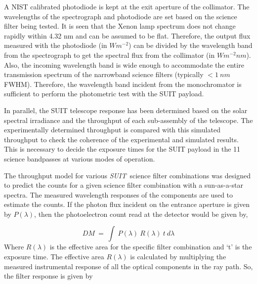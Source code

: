 \documentclass[12pt]{spieman}  %
\newcommand{\suit}{{\it{SUIT}}}
\begin{document}
	A NIST calibrated photodiode is kept at the exit aperture of the collimator. The wavelengths of the spectrograph and photodiode are set based on the science filter being tested. It is seen that the Xenon lamp spectrum does not change rapidly within 4.32 nm and can be assumed to be flat. Therefore, the output flux measured with the photodiode (in $Wm^{-2}$) can be divided by the wavelength band from the spectrograph to get the spectral flux from the collimator (in $W m^{-2} nm$). Also, the incoming wavelength band is wide enough to accommodate the entire transmission spectrum of the narrowband science filters (typically $< 1~nm$ FWHM). Therefore, the wavelength band incident from the monochromator is sufficient to perform the photometric test with the SUIT payload.
		
	In parallel, the SUIT telescope response has been determined based on the solar spectral irradiance and the throughput of each sub-assembly of the telescope. The experimentally determined throughput is compared with this simulated throughput to check the coherence of the experimental and simulated results. This is necessary to decide the exposure times for the SUIT payload in the 11 science bandpasses at various modes of operation.

 The throughput model for various \suit~science filter combinations was designed to predict the counts for a given science filter combination with a sun-as-a-star spectra. The measured wavelength responses of the components are used to estimate the counts. If the photon flux incident on the entrance aperture is given by $P(\lambda)$, then the photoelectron count read at the detector would be given by,

 \begin{equation}\label{eq1}
     DM~=~\int~P(\lambda)~R(\lambda)~t~d\lambda
 \end{equation}
Where $R(\lambda)$ is the effective area for the specific filter combination and ‘t’ is the exposure time. The effective area $R(\lambda)$ is calculated by multiplying the measured instrumental response of all the optical components in the ray path. So, the filter response is given by
\end{document}
